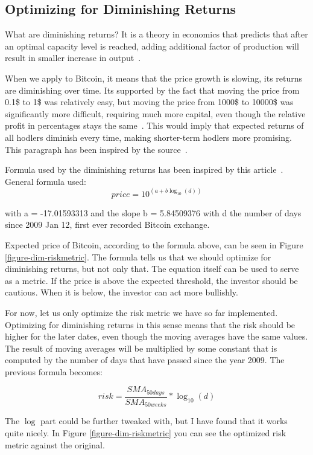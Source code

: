 \subsection*{Optimizing for Diminishing Returns}
\label{subsection-dimreturns}
What are diminishing returns? It is a theory in economics that predicts that after an optimal capacity level is reached, adding additional factor of production will result in smaller increase in output~\cite{investopedia:diminishing-returns}.

When we apply to Bitcoin, it means that the price growth is slowing, its returns are diminishing over time. Its supported by the fact that moving the price from 0.1\$ to 1\$ was relatively easy, but moving the price from 1000\$ to 10000\$ was significantly more difficult, requiring much more capital, even though the relative profit in percentages stays the same~\cite{bitcoin-diminishing-returns}. This would imply that expected returns of all hodlers diminish every time, making shorter-term hodlers more promising. This paragraph has been inspired by the source~\cite{bitcoin-diminishing-returns}.

Formula used by the diminishing returns has been inspired by this article~\cite{bitcoin-diminishing-returns-formula}. General formula used:
$$price = 10^{(a + b \log_{10}(d))}$$

with a = -17.01593313 and the slope b = 5.84509376 with d the number of days since 2009 Jan 12, first ever recorded Bitcoin exchange.

Expected price of Bitcoin, according to the formula above, can be seen in Figure \ref{figure-dim-riskmetric}. The formula tells us that we should optimize for diminishing returns, but not only that. The equation itself can be used to serve as a metric. If the price is above the expected threshold, the investor should be cautious. When it is below, the investor can act more bullishly.

For now, let us only optimize the risk metric we have so far implemented. Optimizing for diminishing returns in this sense means that the risk should be higher for the later dates, even though the moving averages have the same values. The result of moving averages will be multiplied by some constant that is computed by the number of days that have passed since the year 2009. The previous formula becomes:

$$risk = \frac{\mathit{SMA}_{50 days}}{\mathit{SMA}_{50 weeks}} * \log_{10}(d)$$

The $\log$ part could be further tweaked with, but I have found that it works quite nicely. In Figure \ref{figure-dim-riskmetric} you can see the optimized risk metric against the original.

